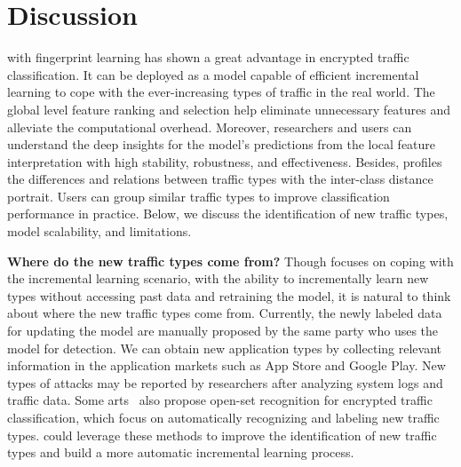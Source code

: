 \section{Discussion}
\label{sec:Discussion}
\sys with fingerprint learning has shown a great advantage in encrypted traffic classification. 
It can be deployed as a model capable of efficient incremental learning to cope with the ever-increasing types of traffic in the real world. 
The global level feature ranking and selection help eliminate unnecessary features and alleviate the computational overhead. 
Moreover, researchers and users can understand the deep insights for the model's predictions from the local feature interpretation with high stability, robustness, and effectiveness. 
Besides, \sys profiles the differences and relations between traffic types with the inter-class distance portrait. 
Users can group similar traffic types to improve classification performance in practice. 
Below, we discuss the identification of new traffic types, model scalability, and limitations. 

\textbf{Where do the new traffic types come from?} Though \sys focuses on coping with the incremental learning scenario, with the ability to incrementally learn new types without accessing past data and retraining the model, it is natural to think about where the new traffic types come from. 
Currently, the newly labeled data for updating the model are manually proposed by the same party who uses the model for detection.
We can obtain new application types by collecting relevant information in the application markets such as App Store and Google Play.
New types of attacks may be reported by researchers after analyzing system logs and traffic data.
Some arts~\cite{shen2019encrypted,zhang2020autonomous} also propose open-set recognition for encrypted traffic classification, which focus on automatically recognizing and labeling new traffic types.
\sys could leverage these methods to improve the identification of new traffic types and build a more automatic incremental learning process.

